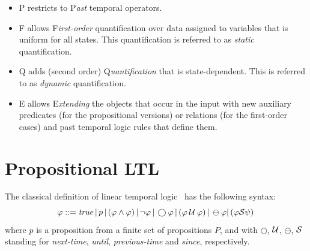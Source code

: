 \begin{itemize}
\item{P} restricts to P{\em ast} temporal operators.
\item{F} allows F{\em irst-order} quantification over
data assigned to variables that is uniform for all states. This quantification is referred to as {\em static} quantification.
\item{Q} adds (second order) Q{\em uantification} that is state-dependent. This is referred to as {\em dynamic} quantification.
\item{E} allows E{\em xtending} the objects that occur in the input with
new auxiliary predicates (for the propositional versions) or relations (for the first-order cases) and past temporal logic rules that define them.
\end{itemize}







\newcommand\eventty{\mathbb{E}}
\newcommand\setof[1]{\mathcal{P}(#1)}


\section{Propositional LTL}

The classical definition of linear temporal logic~\cite{MP} has the following syntax:
\[ \varphi ::= \mathit{true} \, | \,  p \, | \, ( \varphi \wedge \varphi ) \, |  \, \neg  \varphi \, |   \, \bigcirc \varphi \, |  
\, ( \varphi \mathbin{\mathcal{U}} \varphi ) \,|  \, \ominus \varphi |
   \, ( \varphi {\cal S} \psi ) \,  \]
where $p$ is a proposition from a finite set of propositions $P$, and with $\bigcirc$, $\mathbin{\mathcal{U}}$, $\ominus$, ${\cal S}$ standing for {\em next-time}, 
{\em until}, {\em previous-time} and {\em since}, respectively.


